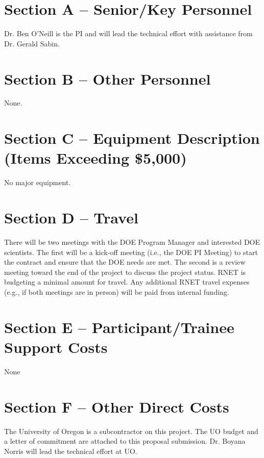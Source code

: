 

\section{Section A -- Senior/Key Personnel}
Dr. Ben O'Neill is the PI and will lead the technical effort with
assistance from Dr. Gerald Sabin. 

\section{Section B -- Other Personnel}
None.

\section{Section C -- Equipment Description (Items Exceeding \$5,000)}
No major equipment.

\section{Section D -- Travel}
There will be two meetings with the DOE Program Manager and interested
DOE scientists. The first will be a kick-off meeting (i.e., the DOE PI
Meeting) to start the contract and ensure that the DOE needs are
met. The second is a review meeting toward the end of the project to
discuss the project status.  RNET is budgeting a minimal amount for
travel. Any additional RNET travel expenses (e.g., if both meetings
are in person) will be paid from internal funding.

\section{Section E -- Participant/Trainee Support Costs}
None
  
\section{Section F -- Other Direct Costs}
The University of Oregon is a subcontractor on this project. The UO budget
and a letter of commitment are attached to this proposal submission. Dr. Boyana Norris will lead the technical effort at UO. 

